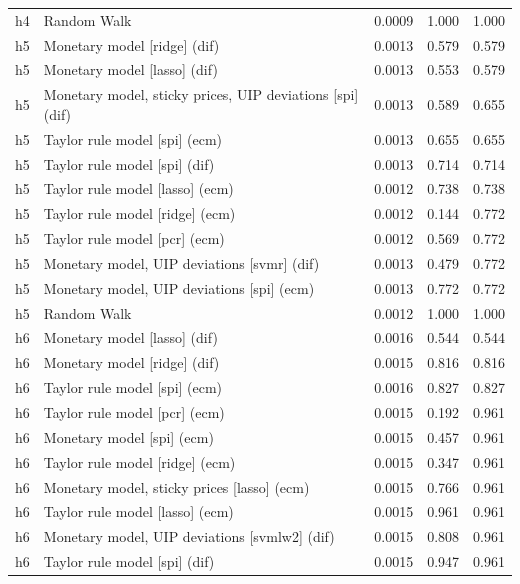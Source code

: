 \begin{ThreePartTable}
\begin{longtable}[t]{cp{5.5cm}ccc}
h4 & \raggedright Random Walk & 0.0009 & 1.000 & 1.000\\
\addlinespace
h5 & \raggedright Monetary model [ridge] (dif) & 0.0013 & 0.579 & 0.579\\
h5 & \raggedright Monetary model [lasso] (dif) & 0.0013 & 0.553 & 0.579\\
h5 & \raggedright Monetary model, sticky prices, UIP deviations [spi] (dif) & 0.0013 & 0.589 & 0.655\\
h5 & \raggedright Taylor rule model [spi] (ecm) & 0.0013 & 0.655 & 0.655\\
h5 & \raggedright Taylor rule model [spi] (dif) & 0.0013 & 0.714 & 0.714\\
h5 & \raggedright Taylor rule model [lasso] (ecm) & 0.0012 & 0.738 & 0.738\\
h5 & \raggedright Taylor rule model [ridge] (ecm) & 0.0012 & 0.144 & 0.772\\
h5 & \raggedright Taylor rule model [pcr] (ecm) & 0.0012 & 0.569 & 0.772\\
h5 & \raggedright Monetary model, UIP deviations [svmr] (dif) & 0.0013 & 0.479 & 0.772\\
h5 & \raggedright Monetary model, UIP deviations [spi] (ecm) & 0.0013 & 0.772 & 0.772\\
h5 & \raggedright Random Walk & 0.0012 & 1.000 & 1.000\\
\addlinespace
h6 & \raggedright Monetary model [lasso] (dif) & 0.0016 & 0.544 & 0.544\\
h6 & \raggedright Monetary model [ridge] (dif) & 0.0015 & 0.816 & 0.816\\
h6 & \raggedright Taylor rule model [spi] (ecm) & 0.0016 & 0.827 & 0.827\\
h6 & \raggedright Taylor rule model [pcr] (ecm) & 0.0015 & 0.192 & 0.961\\
h6 & \raggedright Monetary model [spi] (ecm) & 0.0015 & 0.457 & 0.961\\
h6 & \raggedright Taylor rule model [ridge] (ecm) & 0.0015 & 0.347 & 0.961\\
h6 & \raggedright Monetary model, sticky prices [lasso] (ecm) & 0.0015 & 0.766 & 0.961\\
h6 & \raggedright Taylor rule model [lasso] (ecm) & 0.0015 & 0.961 & 0.961\\
h6 & \raggedright Monetary model, UIP deviations [svmlw2] (dif) & 0.0015 & 0.808 & 0.961\\
h6 & \raggedright Taylor rule model [spi] (dif) & 0.0015 & 0.947 & 0.961\\

\end{longtable}
\end{ThreePartTable}
